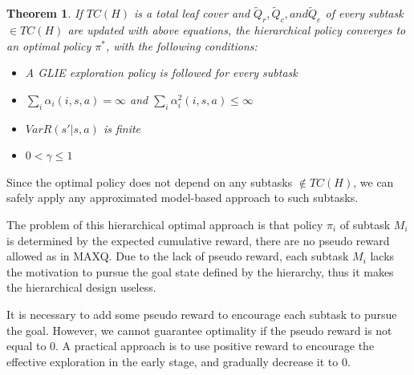 \documentclass{article} %
\newtheorem{theorem}{Theorem}
\begin{document}
\begin{theorem}
    If $TC(H)$ is a total leaf cover 
    and $\tilde{Q}_r, \tilde{Q}_c, and \tilde{Q}_e$ of every subtask $\in TC(H)$ are updated with above equations, 
    the hierarchical policy converges to an optimal policy $\pi^*$,
    with the following conditions:
    \begin{itemize}{}
    \item A GLIE exploration policy is followed for every subtask
    \item $\sum_i \alpha_i(i, s, a) = \infty$ and  $\sum_i \alpha_i^2(i, s, a) \le \infty$
    \item $Var{R(s' | s, a)}$ is finite 
    \item $0 < \gamma \le 1$
    \end{itemize}
\end{theorem}
Since the optimal policy does not depend on any subtasks $\notin TC(H)$, 
we can safely apply any approximated model-based approach to such subtasks.

The problem of this hierarchical optimal approach is that policy $\pi_i$ of subtask $M_i$
is determined by the expected cumulative reward, there are no pseudo reward allowed as
in MAXQ. Due to the lack of pseudo reward, each subtask $M_i$ lacks the motivation to 
pursue the goal state defined by the hierarchy, thus it makes the hierarchical 
design useless. 

It is necessary to add some pseudo reward to encourage each subtask to pursue 
the goal. However, we cannot guarantee optimality if the pseudo reward is not equal to 0.
A practical approach is to use positive reward to encourage the effective exploration
in the early stage, and gradually decrease it to 0. 

\end{document}

